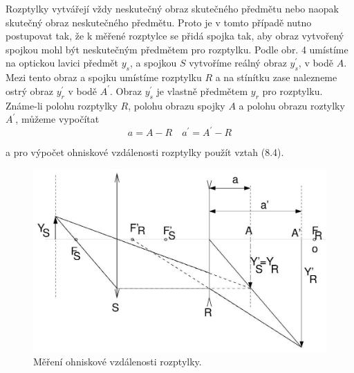 \documentclass[czech,11pt,a4paper]{article}
\begin{document}
\begin{multicols}{2}
Rozptylky vytvářejí vždy neskutečný obraz skutečného předmětu nebo naopak skutečný obraz neskutečného předmětu. Proto je v tomto případě nutno postupovat tak, že k měřené rozptylce se přidá spojka tak, aby obraz vytvořený spojkou mohl být neskutečným předmětem pro rozptylku. Podle obr. 4 umístíme na optickou lavici předmět $y_{s}$, a spojkou $S$ vytvoříme reálný obraz $y_{s}^{\prime}$, v bodě $A$. Mezi tento obraz a spojku umístíme rozptylku $R$ a na stínítku zase nalezneme ostrý obraz $y_{r}^{\prime}$ v bodě $A^{\prime}$. Obraz $y_{s}^{\prime}$ je vlastně předmětem $y_{r}$ pro rozptylku. Známe-li polohu rozptylky $R$, polohu obrazu spojky $A$ a polohu obrazu roztylky $A^{\prime}$, můžeme vypočítat
\begin{equation}
	a=A-R \quad a^{\prime}=A^{\prime}-R
\end{equation}

a pro výpočet ohniskové vzdálenosti rozptylky použít vztah (8.4).
\begin{figure}[H]
	\includegraphics[width = 0.95\linewidth, center]{2024_12_03_2b013636ff75d184213cg-4}
	\caption{Měření ohniskové vzdálenosti rozptylky.}
\end{figure}


\end{multicols}
\end{document}
